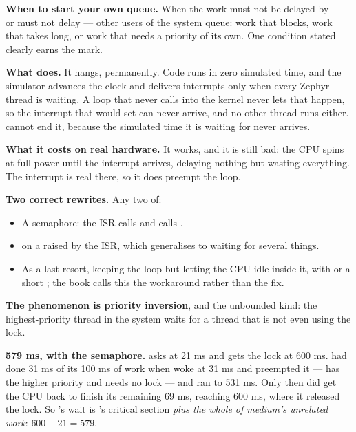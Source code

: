 \textbf{When to start your own queue.} When the work must not be delayed by --- or must not delay
--- other users of the system queue: work that blocks, work that takes long, or work that needs a
priority of its own. One condition stated clearly earns the mark. 

\textbf{What  does.} It hangs, permanently. Code runs in zero simulated time, and
the simulator advances the clock and delivers interrupts only when every Zephyr thread is waiting. A
loop that never calls into the kernel never lets that happen, so the interrupt that would set
 can never arrive, and no other thread runs either.  cannot end it,
because the simulated time it is waiting for never arrives. 

\textbf{What it costs on real hardware.} It works, and it is still bad: the CPU spins at full power
until the interrupt arrives, delaying nothing but wasting everything. The interrupt is real there,
so it does preempt the loop. 

\textbf{Two correct rewrites.} Any two of:
\begin{itemize}
  \item A semaphore: the ISR calls  and  calls
    .
  \item {} on a  raised by the ISR, which generalises to waiting
    for several things.
  \item As a last resort, keeping the loop but letting the CPU idle inside it, with
     or a short ; the book calls this the workaround rather
    than the fix.
\end{itemize}


\textbf{The phenomenon is priority inversion}, and the unbounded kind: the highest-priority thread
in the system waits for a thread that is not even using the lock. 

\textbf{579 ms, with the semaphore.}  asks at 21 ms and gets the lock at 600 ms.
 had done 31 ms of its 100 ms of work when  woke at 31 ms and preempted it
---  has the higher priority and needs no lock --- and ran to 531 ms. Only then did
 get the CPU back to finish its remaining 69 ms, reaching 600 ms, where it released the
lock. So 's wait is 's critical section \emph{plus the whole of medium's
unrelated work}: $600 - 21 = 579$. 

